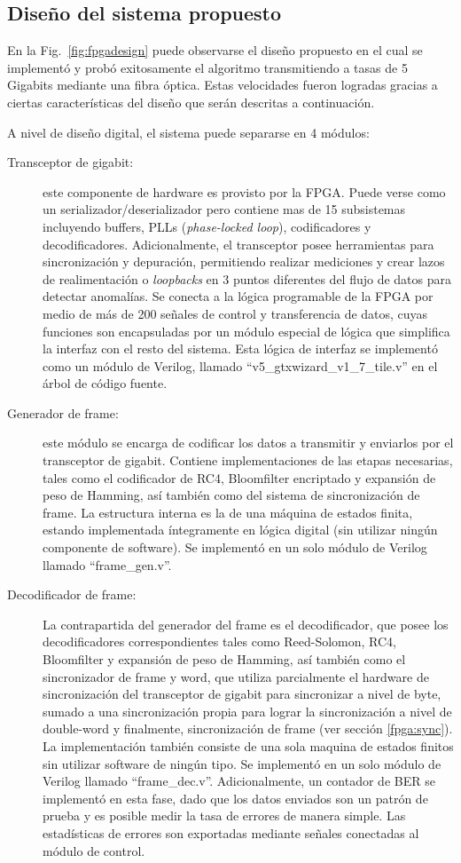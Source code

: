 \subsection{Diseño del sistema propuesto}
En la Fig.~\ref{fig:fpgadesign} puede observarse el diseño propuesto en el cual se implementó y probó exitosamente el algoritmo transmitiendo a tasas de 5 Gigabits mediante una fibra óptica.
Estas velocidades fueron logradas gracias a ciertas características del diseño que serán descritas a continuación.

A nivel de diseño digital, el sistema puede separarse en 4 módulos:

\begin{description}
 \item[Transceptor de gigabit:] este componente de hardware es provisto por la FPGA. Puede verse como un serializador/deserializador pero contiene mas de 15 subsistemas incluyendo buffers, PLLs (\textit{phase-locked loop}), codificadores y decodificadores. Adicionalmente, el transceptor posee herramientas para sincronización y depuración, permitiendo realizar mediciones y crear lazos de realimentación o \textit{loopbacks} en 3 puntos diferentes del flujo de datos para detectar anomalías. Se conecta a la lógica programable de la FPGA por medio de más de 200 señales de control y transferencia de datos, cuyas funciones son encapsuladas por un módulo especial de lógica que simplifica la interfaz con el resto del sistema. Esta lógica de interfaz se implementó como un módulo de Verilog, llamado ``v5\_gtxwizard\_v1\_7\_tile.v'' en el árbol de código fuente.

 \item[Generador de frame:] este módulo se encarga de codificar los datos a transmitir y enviarlos por el transceptor de gigabit. Contiene implementaciones de las etapas necesarias, tales como el codificador de RC4, Bloomfilter encriptado y expansión de peso de Hamming, así también como del sistema de sincronización de frame. La estructura interna es la de una máquina de estados finita, estando implementada íntegramente en lógica digital (sin utilizar ningún componente de software). Se implementó en un solo módulo de Verilog llamado ``frame\_gen.v''.
 
 \item[Decodificador de frame:] La contrapartida del generador del frame es el decodificador, que posee los decodificadores correspondientes tales como Reed-Solomon, RC4, Bloomfilter y expansión de peso de Hamming, así también como el sincronizador de frame y word, que utiliza parcialmente el hardware de sincronización del transceptor de gigabit para sincronizar a nivel de byte, sumado a una sincronización propia para lograr la sincronización a nivel de double-word y finalmente, sincronización de frame (ver sección \ref{fpga:sync}). La implementación también consiste de una sola maquina de estados finitos sin utilizar software de ningún tipo. Se implementó en un solo módulo de Verilog llamado ``frame\_dec.v''. Adicionalmente, un contador de BER se implementó en esta fase, dado que los datos enviados son un patrón de prueba y es posible medir la tasa de errores de manera simple. Las estadísticas de errores son exportadas mediante señales conectadas al módulo de control.
 

\end{description}
